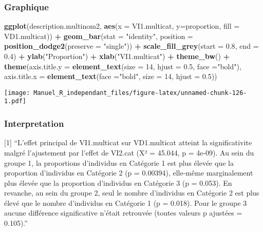 \documentclass[
]{book}
\newenvironment{Shaded}{\begin{snugshade}}{\end{snugshade}}
\newcommand{\DataTypeTok}[1]{\textcolor[rgb]{0.13,0.29,0.53}{#1}}
\newcommand{\DecValTok}[1]{\textcolor[rgb]{0.00,0.00,0.81}{#1}}
\newcommand{\FloatTok}[1]{\textcolor[rgb]{0.00,0.00,0.81}{#1}}
\newcommand{\KeywordTok}[1]{\textcolor[rgb]{0.13,0.29,0.53}{\textbf{#1}}}
\newcommand{\NormalTok}[1]{#1}
\newcommand{\OperatorTok}[1]{\textcolor[rgb]{0.81,0.36,0.00}{\textbf{#1}}}
\newcommand{\StringTok}[1]{\textcolor[rgb]{0.31,0.60,0.02}{#1}}
\begin{document}
\hypertarget{graphique-14}{%
\subsubsection{Graphique}\label{graphique-14}}

\begin{Shaded}
\begin{Highlighting}[]
\KeywordTok{ggplot}\NormalTok{(description.multinom2, }
       \KeywordTok{aes}\NormalTok{(}\DataTypeTok{x =}\NormalTok{ VI1.multicat, }\DataTypeTok{y=}\NormalTok{proportion, }\DataTypeTok{fill =}\NormalTok{ VD1.multicat)) }\OperatorTok{+}\StringTok{ }
\StringTok{  }\KeywordTok{geom_bar}\NormalTok{(}\DataTypeTok{stat =} \StringTok{"identity"}\NormalTok{, }\DataTypeTok{position =} \KeywordTok{position_dodge2}\NormalTok{(}\DataTypeTok{preserve =} \StringTok{"single"}\NormalTok{)) }\OperatorTok{+}\StringTok{ }
\StringTok{  }\KeywordTok{scale_fill_grey}\NormalTok{(}\DataTypeTok{start =} \FloatTok{0.8}\NormalTok{, }\DataTypeTok{end =} \FloatTok{0.4}\NormalTok{) }\OperatorTok{+}
\StringTok{  }\KeywordTok{ylab}\NormalTok{(}\StringTok{"Proportion"}\NormalTok{) }\OperatorTok{+}\StringTok{ }\KeywordTok{xlab}\NormalTok{(}\StringTok{"VI1.multicat"}\NormalTok{) }\OperatorTok{+}\StringTok{ }
\StringTok{  }\KeywordTok{theme_bw}\NormalTok{() }\OperatorTok{+}\StringTok{ }
\StringTok{  }\KeywordTok{theme}\NormalTok{(}\DataTypeTok{axis.title.y =} \KeywordTok{element_text}\NormalTok{(}\DataTypeTok{size =} \DecValTok{14}\NormalTok{, }\DataTypeTok{hjust =} \FloatTok{0.5}\NormalTok{, }\DataTypeTok{face =}\StringTok{"bold"}\NormalTok{), }
        \DataTypeTok{axis.title.x =} \KeywordTok{element_text}\NormalTok{(}\DataTypeTok{face =}\StringTok{"bold"}\NormalTok{, }\DataTypeTok{size =} \DecValTok{14}\NormalTok{, }\DataTypeTok{hjust =} \FloatTok{0.5}\NormalTok{))}
\end{Highlighting}
\end{Shaded}

\texttt{[image: Manuel\_R\_independant\_files/figure-latex/unnamed-chunk-126-1.pdf]}

\hypertarget{interpretation-14}{%
\subsubsection{Interpretation}\label{interpretation-14}}

{[}1{]} ``L'effet principal de VI1.multicat sur VD1.multicat atteint la significativite malgré l'ajustement par l'effet de VI2.cat (X² = 45.044, p = 4e-09). Au sein du groupe 1, la proportions d'individus en Catégorie 1 est plus élevée que la proportion d'individus en Catégorie 2 (p = 0.00394), elle-même marginalement plus élevée que la proportion d'individus en Catégorie 3 (p = 0.053). En revanche, au sein du groupe 2, seul le nombre d'individus en Catégorie 2 est plus élevé que le nombre d'individus en Catégorie 1 (p = 0.018). Pour le groupe 3 aucune différence significative n'était retrouvée (toutes valeurs p ajustées = 0.105).''
\end{document}
